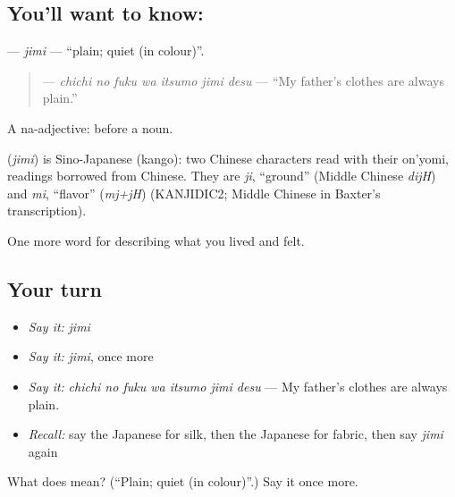\subsection*{You'll want to know: }
\textbf{} — \emph{jimi} — \textquotedblleft{}plain; quiet (in colour)\textquotedblright{}.

\begin{quote}
\textbf{   } — \emph{chichi no fuku wa itsumo jimi desu} — \textquotedblleft{}My father's clothes are always plain.\textquotedblright{}
\end{quote}

A na-adjective:  before a noun.

\begin{cousinweb}
\textbf{} (\emph{jimi}) is Sino-Japanese (kango): two Chinese characters read with their on'yomi, readings borrowed from Chinese. They are \emph{ji}, \textquotedblleft{}ground\textquotedblright{} (Middle Chinese \emph{dijH}) and \emph{mi}, \textquotedblleft{}flavor\textquotedblright{} (\emph{mj+jH}) (KANJIDIC2; Middle Chinese in Baxter's transcription).
\end{cousinweb}

\begin{grammarlens}[title={What you've built}]
One more word for describing what you lived and felt.
\end{grammarlens}

\subsection*{Your turn}
\begin{itemize}
\raggedright
  \item \emph{Say it:} \emph{jimi}
  \item \emph{Say it:} \emph{jimi}, once more
  \item \emph{Say it:} \emph{chichi no fuku wa itsumo jimi desu} — My father's clothes are always plain.
  \item \emph{Recall:} say the Japanese for silk, then the Japanese for fabric, then say \emph{jimi} again
\end{itemize}

\begin{tcolorbox}[breakable,colback=teal!4,colframe=teal!35!black,title={Before you move on}]
What does  mean? (\textquotedblleft{}Plain; quiet (in colour)\textquotedblright{}.) Say it once more.
\end{tcolorbox}
